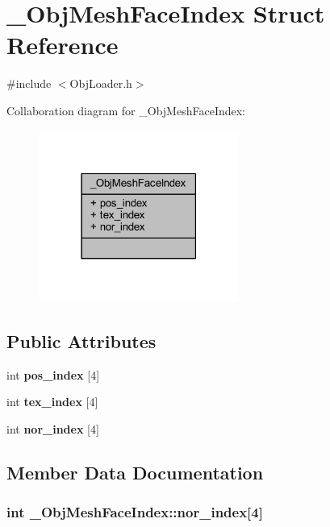 \section{\+\_\+\+Obj\+Mesh\+Face\+Index Struct Reference}
\label{struct___obj_mesh_face_index}


{\ttfamily \#include $<$Obj\+Loader.\+h$>$}



Collaboration diagram for \+\_\+\+Obj\+Mesh\+Face\+Index\+:\nopagebreak
\begin{figure}[H]
\begin{center}
\leavevmode
\includegraphics[width=186pt]{da/d98/struct___obj_mesh_face_index__coll__graph}
\end{center}
\end{figure}
\subsection*{Public Attributes}
\begin{DoxyCompactItemize}
\item 
int {\bf pos\+\_\+index} [4]
\item 
int {\bf tex\+\_\+index} [4]
\item 
int {\bf nor\+\_\+index} [4]
\end{DoxyCompactItemize}


\subsection{Member Data Documentation}
\subsubsection[{nor\+\_\+index}]{\setlength{\rightskip}{0pt plus 5cm}int \+\_\+\+Obj\+Mesh\+Face\+Index\+::nor\+\_\+index[4]}\label{struct___obj_mesh_face_index_a726d96683d89e345778079a931b01aab}
